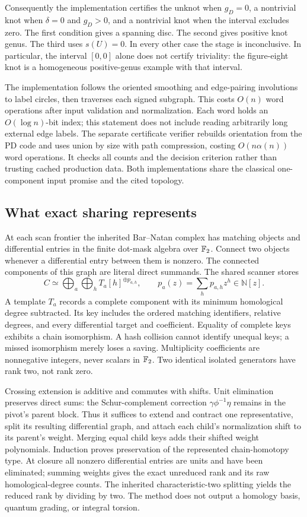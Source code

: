 Consequently the implementation certifies the unknot when $g_D=0$, a
nontrivial knot when $\delta=0$ and $g_D>0$, and a nontrivial knot when the
interval excludes zero. The first condition gives a spanning disc. The
second gives positive knot genus. The third uses $s(U)=0$. In every other
case the stage is inconclusive. In particular, the interval $[0,0]$ alone
does not certify triviality: the figure-eight knot is a homogeneous
positive-genus example with that interval.

The implementation follows the oriented smoothing and edge-pairing
involutions to label circles, then traverses each signed subgraph. This
costs $O(n)$ word operations after input validation and normalization.
Each word holds an $O(\log n)$-bit index; this statement does not include
reading arbitrarily long external edge labels. The separate certificate
verifier rebuilds orientation from the PD code and uses union by size with
path compression, costing $O(n\alpha(n))$ word operations. It checks all
counts and the decision criterion rather than trusting cached production
data. Both implementations share the classical one-component input promise
and the cited topology.

\subsection{What exact sharing represents}
At each scan frontier the inherited Bar--Natan complex has matching objects
and differential entries in the finite dot-mask algebra over $\mathbb{F}_2$.
Connect two objects whenever a differential entry between them is nonzero.
The connected components of this graph are literal direct summands.
The shared scanner stores
\[
 C\simeq\bigoplus_a\bigoplus_h T_a[h]^{\oplus p_{a,h}},
 \qquad p_a(z)=\sum_h p_{a,h}z^h\in\mathbb N[z].
\]
A template $T_a$ records a complete component with its minimum homological
degree subtracted. Its key includes the ordered matching identifiers,
relative degrees, and every differential target and coefficient. Equality
of complete keys exhibits a chain isomorphism. A hash collision cannot
identify unequal keys; a missed isomorphism merely loses a saving.
Multiplicity coefficients are nonnegative integers, never scalars in $\mathbb{F}_2$.
Two identical isolated generators have rank two, not rank zero.

Crossing extension is additive and commutes with shifts. Unit elimination
preserves direct sums: the Schur-complement correction
$\gamma\phi^{-1}\eta$ remains in the pivot's parent block. Thus it suffices
to extend and contract one representative, split its resulting differential
graph, and attach each child's normalization shift to its parent's weight.
Merging equal child keys adds their shifted weight polynomials. Induction
proves preservation of the represented chain-homotopy type. At closure all
nonzero differential entries are units and have been eliminated; summing
weights gives the exact unreduced rank and its raw homological-degree
counts. The inherited characteristic-two splitting yields the reduced rank
by dividing by two. The method does not output a homology basis, quantum
grading, or integral torsion.

